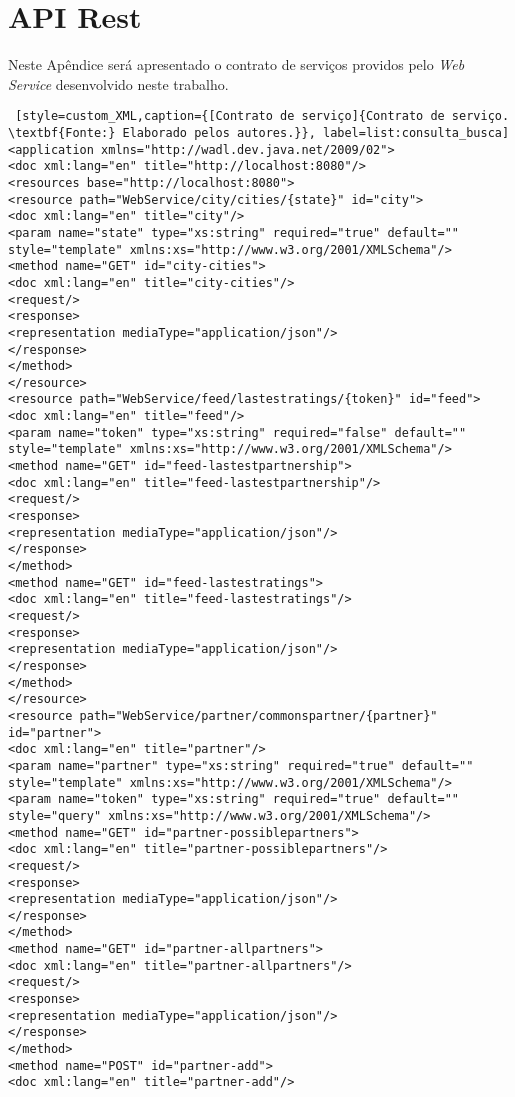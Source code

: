 \chapter*{API Rest}
\label{apendice:4}

Neste Apêndice será apresentado o contrato de serviços providos pelo \textit{Web Service} desenvolvido neste trabalho.

\captionsetup[code]{list=no}
\begin{lstlisting} [style=custom_XML,caption={[Contrato de serviço]{Contrato de serviço. \textbf{Fonte:} Elaborado pelos autores.}}, label=list:consulta_busca] 	
<application xmlns="http://wadl.dev.java.net/2009/02">
<doc xml:lang="en" title="http://localhost:8080"/>
<resources base="http://localhost:8080">
<resource path="WebService/city/cities/{state}" id="city">
<doc xml:lang="en" title="city"/>
<param name="state" type="xs:string" required="true" default="" style="template" xmlns:xs="http://www.w3.org/2001/XMLSchema"/>
<method name="GET" id="city-cities">
<doc xml:lang="en" title="city-cities"/>
<request/>
<response>
<representation mediaType="application/json"/>
</response>
</method>
</resource>
<resource path="WebService/feed/lastestratings/{token}" id="feed">
<doc xml:lang="en" title="feed"/>
<param name="token" type="xs:string" required="false" default="" style="template" xmlns:xs="http://www.w3.org/2001/XMLSchema"/>
<method name="GET" id="feed-lastestpartnership">
<doc xml:lang="en" title="feed-lastestpartnership"/>
<request/>
<response>
<representation mediaType="application/json"/>
</response>
</method>
<method name="GET" id="feed-lastestratings">
<doc xml:lang="en" title="feed-lastestratings"/>
<request/>
<response>
<representation mediaType="application/json"/>
</response>
</method>
</resource>
<resource path="WebService/partner/commonspartner/{partner}" id="partner">
<doc xml:lang="en" title="partner"/>
<param name="partner" type="xs:string" required="true" default="" style="template" xmlns:xs="http://www.w3.org/2001/XMLSchema"/>
<param name="token" type="xs:string" required="true" default="" style="query" xmlns:xs="http://www.w3.org/2001/XMLSchema"/>
<method name="GET" id="partner-possiblepartners">
<doc xml:lang="en" title="partner-possiblepartners"/>
<request/>
<response>
<representation mediaType="application/json"/>
</response>
</method>
<method name="GET" id="partner-allpartners">
<doc xml:lang="en" title="partner-allpartners"/>
<request/>
<response>
<representation mediaType="application/json"/>
</response>
</method>
<method name="POST" id="partner-add">
<doc xml:lang="en" title="partner-add"/>

\end{lstlisting}
